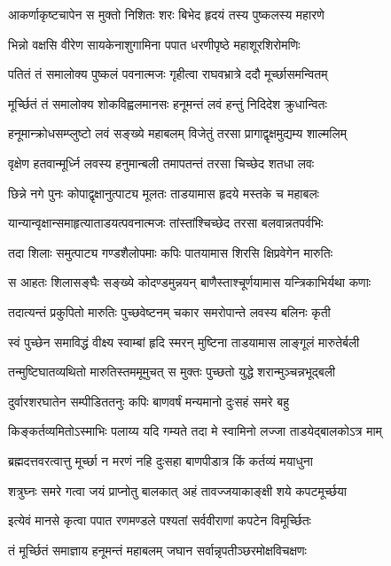 \twolineshloka
{आकर्णाकृष्टचापेन स मुक्तो निशितः शरः}
{बिभेद हृदयं तस्य पुष्कलस्य महारणे}%

\twolineshloka
{भिन्नो वक्षसि वीरेण सायकेनाशुगामिना}
{पपात धरणीपृष्ठे महाशूरशिरोमणिः}%

\twolineshloka
{पतितं तं समालोक्य पुष्कलं पवनात्मजः}
{गृहीत्वा राघवभ्रात्रे ददौ मूर्च्छासमन्वितम्}%

\twolineshloka
{मूर्च्छितं तं समालोक्य शोकविह्वलमानसः}
{हनूमन्तं लवं हन्तुं निदिदेश क्रुधान्वितः}%

\twolineshloka
{हनूमान्क्रोधसम्प्लुष्टो लवं सङ्ख्ये महाबलम्}
{विजेतुं तरसा प्रागाद्वृक्षमुद्यम्य शाल्मलिम्}%

\twolineshloka
{वृक्षेण हतवान्मूर्ध्नि लवस्य हनुमान्बली}
{तमापतन्तं तरसा चिच्छेद शतधा लवः}%

\twolineshloka
{छिन्ने नगे पुनः कोपाद्वृक्षानुत्पाट्य मूलतः}
{ताडयामास हृदये मस्तके च महाबलः}%

\twolineshloka
{यान्यान्वृक्षान्समाहृत्याताडयत्पवनात्मजः}
{तांस्तांश्चिच्छेद तरसा बलवान्नतपर्वभिः}%

\twolineshloka
{तदा शिलाः समुत्पाट्य गण्डशैलोपमाः कपिः}
{पातयामास शिरसि क्षिप्रवेगेन मारुतिः}%

\twolineshloka
{स आहतः शिलासङ्घैः सङ्ख्ये कोदण्डमुन्नयन्}
{बाणैस्ताश्चूर्णयामास यन्त्रिकाभिर्यथा कणाः}%

\twolineshloka
{तदात्यन्तं प्रकुपितो मारुतिः पुच्छवेष्टनम्}
{चकार समरोपान्ते लवस्य बलिनः कृती}%

\twolineshloka
{स्वं पुच्छेन समाविद्धं वीक्ष्य स्वाम्बां हृदि स्मरन्}
{मुष्टिना ताडयामास लाङ्गूलं मारुतेर्बली}%

\twolineshloka
{तन्मुष्टिघातव्यथितो मारुतिस्तममूमुचत्}
{स मुक्तः पुच्छतो युद्धे शरान्मुञ्चन्नभूद्बली}%

\twolineshloka
{दुर्वारशरघातेन सम्पीडिततनुः कपिः}
{बाणवर्षं मन्यमानो दुःसहं समरे बहु}%

\twolineshloka
{किङ्कर्तव्यमितोऽस्माभिः पलाय्य यदि गम्यते}
{तदा मे स्वामिनो लज्जा ताडयेद्बालकोऽत्र माम्}%

\twolineshloka
{ब्रह्मदत्तवरत्वात्तु मूर्च्छा न मरणं नहि}
{दुःसहा बाणपीडात्र किं कर्तव्यं मयाधुना}%

\twolineshloka
{शत्रुघ्नः समरे गत्वा जयं प्राप्नोतु बालकात्}
{अहं तावज्जयाकाङ्क्षी शये कपटमूर्च्छया}%

\twolineshloka
{इत्येवं मानसे कृत्वा पपात रणमण्डले}
{पश्यतां सर्ववीराणां कपटेन विमूर्च्छितः}%

\twolineshloka
{तं मूर्च्छितं समाज्ञाय हनूमन्तं महाबलम्}
{जघान सर्वान्नृपतीञ्छरमोक्षविचक्षणः}%


